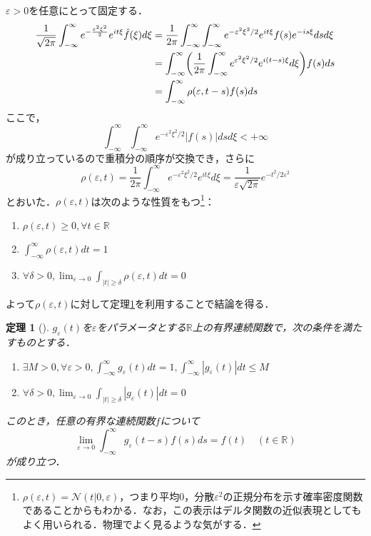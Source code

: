 \documentclass[dvipdfmx,a4j,10pt]{jsarticle}
\makeatletter
\theoremstyle{mystyle1}
\newtheorem{theorem}{定理}[section]
\theoremstyle{mystyle3}
\theoremstyle{mystyle4}
\theoremstyle{mystyle6}
\theoremstyle{mystyle2}
\theoremstyle{mystyle5}
\renewenvironment{proof}[1][\proofname]{\par
  \pushQED{\qed}%
  \normalfont
  \topsep6\p@\@plus6\p@ \trivlist
  \item[\hskip\labelsep{\bfseries\sffamily #1}]\ignorespaces
}{%
  \popQED\endtrivlist\@endpefalse
}
\renewcommand\proofname{証明}
\newenvironment{thm}[1][]
{\begin{tcolorbox}[
    enhanced,
    boxrule=0pt,
    arc=0mm,
    frame hidden,
    borderline west={2pt}{-4pt}{red},
    breakable = true
    ]
    \begin{theorem}[#1]
}
{\end{theorem}\end{tcolorbox}}
\makeatother
\begin{document}
\begin{proof}
	$\varepsilon>0$を任意にとって固定する．
	\begin{equation}\label{eq:3-1}
		\begin{split}
			\frac{1}{\sqrt{2\pi}}\int_{-\infty}^\infty e^{-\frac{\varepsilon^2\xi^2}{2}}e^{it\xi}\hat{f}(\xi)d\xi
			&=\frac{1}{2\pi}\int_{-\infty}^\infty\int_{-\infty}^\infty e^{-\varepsilon^2\xi^2/2}e^{it\xi}f(s)e^{-is\xi}dsd\xi \\
			&=\int_{-\infty}^\infty\mleft(\frac{1}{2\pi}\int_{-\infty}^\infty e^{\varepsilon^2\xi^2/2}e^{i(t-s)\xi}d\xi\mright)f(s)ds \\
			&=\int_{-\infty}^\infty \rho(\varepsilon,t-s)f(s)ds
		\end{split}
	\end{equation}
	ここで，
	\[
		\int_{-\infty}^\infty\int_{-\infty}^\infty e^{-\varepsilon^2\xi^2/2}|f(s)|dsd\xi<+\infty
	\]
	が成り立っているので重積分の順序が交換でき，さらに
	\[
		\rho(\varepsilon,t)=\frac{1}{2\pi}\int_{-\infty}^\infty e^{-\varepsilon^2\xi^2/2}e^{it\xi}d\xi=\frac{1}{\varepsilon\sqrt{2\pi}}e^{-t^2/2\varepsilon^2}
	\]
	とおいた．$\rho(\varepsilon,t)$は次のような性質をもつ\footnote{
		$\rho(\varepsilon,t)=\mathcal{N}(t|0,\varepsilon)$，つまり平均$0$，分散$\varepsilon^2$の正規分布を示す確率密度関数であることからもわかる．なお，この表示はデルタ関数の近似表現としてもよく用いられる．物理でよく見るような気がする．
	}：
	\begin{enumerate}
		\item $\rho(\varepsilon,t)\geq 0,\forall t\in\mathbb{R}$
		\item $\int_{-\infty}^\infty \rho(\varepsilon,t)dt=1$
		\item $\forall\delta>0,\lim_{\varepsilon\to 0}\int_{|t|\geq\delta}\rho(\varepsilon,t)dt=0$
	\end{enumerate}
	よって$\rho(\varepsilon,t)$に対して定理\ref{thm:3-4}を利用することで結論を得る．
\end{proof}

\begin{thm}\label{thm:3-4}
	$g_\varepsilon(t)$を$\varepsilon$をパラメータとする$\mathbb{R}$上の有界連続関数で，次の条件を満たすものとする．
	\begin{enumerate}
		\item $\exists M>0,\forall\varepsilon>0,\int_{-\infty}^\infty g_\varepsilon(t)dt=1,\int_{-\infty}^\infty|g_\varepsilon(t)|dt\leq M$
		\item $\forall \delta>0,\lim_{\varepsilon\to 0}\int_{|t|\geq \delta}|g_\varepsilon(t)|dt=0$
	\end{enumerate}
	このとき，任意の有界な連続関数$f$について
	\[
		\lim_{\varepsilon\to 0}\int_{-\infty}^\infty g_\varepsilon(t-s)f(s)ds=f(t)\quad(t\in\mathbb{R})
	\]
	が成り立つ．
\end{thm}
\end{document}
